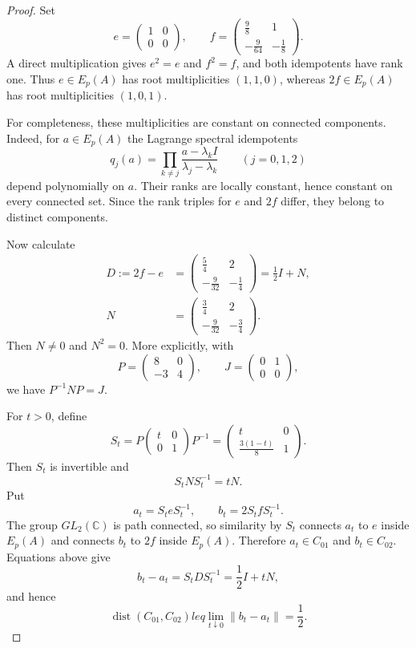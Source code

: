 \documentclass[11pt]{article}
\newcommand{\C}{\mathbb C}
\newcommand{\dist}{\operatorname{dist}}
\begin{document}
\begin{proof}
Set
\[
 e=\begin{pmatrix}1&0\\0&0\end{pmatrix},
 \qquad
 f=\begin{pmatrix}\frac98&1\\[2pt]-\frac9{64}&-\frac18\end{pmatrix}.
\]
A direct multiplication gives $e^2=e$ and $f^2=f$, and both idempotents have
rank one.  Thus $e\in E_p(A)$ has root multiplicities $(1,1,0)$, whereas
$2f\in E_p(A)$ has root multiplicities $(1,0,1)$.

For completeness, these multiplicities are constant on connected components.
Indeed, for $a\in E_p(A)$ the Lagrange spectral idempotents
\begin{equation}\label{eq:riesz}
 q_j(a)=\prod_{k\neq j}\frac{a-\lambda_kI}{\lambda_j-\lambda_k}
 \qquad(j=0,1,2)
\end{equation}
depend polynomially on $a$.  Their ranks are locally constant, hence constant
on every connected set.  Since the rank triples for $e$ and $2f$ differ, they
belong to distinct components.

Now calculate
\begin{align*}
 D:=2f-e
 &=\begin{pmatrix}\frac54&2\\[2pt]-\frac9{32}&-\frac14\end{pmatrix}
   =\frac12I+N,\\
 N&=\begin{pmatrix}\frac34&2\\[2pt]-\frac9{32}&-\frac34\end{pmatrix}.
\end{align*}
Then $N\neq0$ and $N^2=0$.  More explicitly, with
\[
 P=\begin{pmatrix}8&0\\-3&4\end{pmatrix},
 \qquad J=\begin{pmatrix}0&1\\0&0\end{pmatrix},
\]
we have $P^{-1}NP=J$.

For $t>0$, define
\[
 S_t=P\begin{pmatrix}t&0\\0&1\end{pmatrix}P^{-1}
 =\begin{pmatrix}t&0\\[2pt]\frac{3(1-t)}8&1\end{pmatrix}.
\]
Then $S_t$ is invertible and
\begin{equation}\label{eq:shrink}
 S_tNS_t^{-1}=tN.
\end{equation}
Put
\[
 a_t=S_teS_t^{-1},
 \qquad b_t=2S_tfS_t^{-1}.
\]
The group $GL_2(\C)$ is path connected, so similarity by $S_t$ connects
$a_t$ to $e$ inside $E_p(A)$ and connects $b_t$ to $2f$ inside $E_p(A)$.
Therefore $a_t\in C_{01}$ and $b_t\in C_{02}$.  Equations above give
\[
 b_t-a_t=S_tDS_t^{-1}=\frac12I+tN,
\]
and hence
\[
 \dist(C_{01},C_{02})leq
 \lim_{t\downarrow0}\|b_t-a_t\|=\frac12.
\]


\end{proof}
\end{document}
